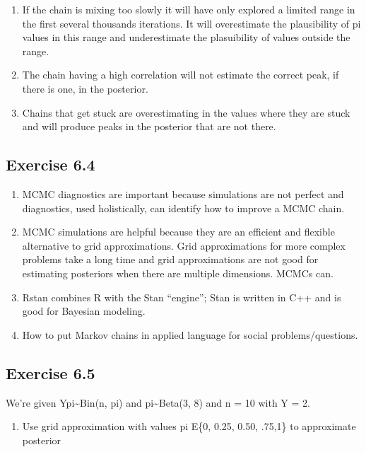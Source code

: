 \documentclass[
]{article}
\providecommand{\tightlist}{%
  \setlength{\itemsep}{0pt}\setlength{\parskip}{0pt}}
\begin{document}
\begin{enumerate}
\def\labelenumi{\alph{enumi})}
\item
  If the chain is mixing too slowly it will have only explored a limited
  range in the first several thousands iterations. It will overestimate
  the plausibility of pi values in this range and underestimate the
  plasuibility of values outside the range.
\item
  The chain having a high correlation will not estimate the correct
  peak, if there is one, in the posterior.
\item
  Chains that get stuck are overestimating in the values where they are
  stuck and will produce peaks in the posterior that are not there.
\end{enumerate}

\hypertarget{exercise-6.4}{%
\subsection{Exercise 6.4}\label{exercise-6.4}}

\begin{enumerate}
\def\labelenumi{\alph{enumi})}
\item
  MCMC diagnostics are important because simulations are not perfect and
  diagnostics, used holistically, can identify how to improve a MCMC
  chain.
\item
  MCMC simulations are helpful because they are an efficient and
  flexible alternative to grid approximations. Grid approximations for
  more complex problems take a long time and grid approximations are not
  good for estimating posteriors when there are multiple dimensions.
  MCMCs can.
\item
  Rstan combines R with the Stan ``engine''; Stan is written in C++ and
  is good for Bayesian modeling.
\item
  How to put Markov chains in applied language for social
  problems/questions.
\end{enumerate}

\hypertarget{exercise-6.5}{%
\subsection{Exercise 6.5}\label{exercise-6.5}}

We're given Y\textbar pi\textasciitilde Bin(n, pi) and
pi\textasciitilde Beta(3, 8) and n = 10 with Y = 2.

\begin{enumerate}
\def\labelenumi{\alph{enumi})}
\tightlist
\item
  Use grid approximation with values pi E\{0, 0.25, 0.50, .75,1\} to
  approximate posterior
\end{enumerate}
\end{document}
